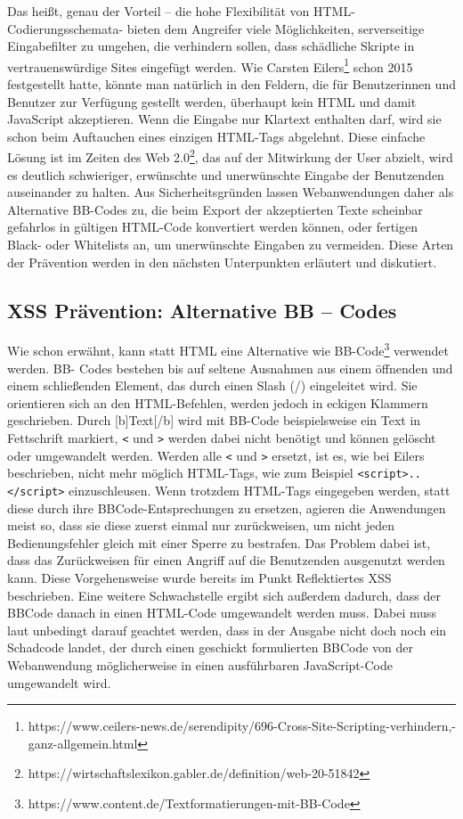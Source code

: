 Das heißt, genau der Vorteil – die hohe Flexibilität von HTML-Codierungsschemata- bieten dem Angreifer viele Möglichkeiten, serverseitige Eingabefilter zu umgehen, die verhindern sollen, dass schädliche Skripte in vertrauenswürdige Sites eingefügt werden.
Wie Carsten Eilers\footnote{https://www.ceilers-news.de/serendipity/696-Cross-Site-Scripting-verhindern,-ganz-allgemein.html} schon 2015 festgestellt hatte, könnte man natürlich in den Feldern, die für Benutzerinnen und Benutzer zur Verfügung gestellt werden, überhaupt kein HTML und damit JavaScript akzeptieren. Wenn die Eingabe nur Klartext enthalten darf, wird sie schon beim Auftauchen eines einzigen HTML-Tags abgelehnt. Diese einfache Lösung ist im Zeiten des Web 2.0\footnote{https://wirtschaftslexikon.gabler.de/definition/web-20-51842}, das auf der Mitwirkung der User abzielt, wird es deutlich schwieriger, erwünschte und unerwünschte Eingabe der Benutzenden auseinander zu halten. Aus Sicherheitsgründen lassen Webanwendungen daher als Alternative BB-Codes zu, die beim Export der akzeptierten Texte scheinbar gefahrlos in gültigen HTML-Code konvertiert werden können, oder fertigen Black- oder Whitelists an, um unerwünschte Eingaben zu vermeiden. Diese Arten der Prävention werden in den nächsten Unterpunkten erläutert und diskutiert.

\subsection{XSS Prävention: Alternative BB – Codes}
\label{subsection:prevention_bb-codes}

Wie schon erwähnt, kann statt HTML eine Alternative wie BB-Code\footnote{https://www.content.de/Textformatierungen-mit-BB-Code} verwendet werden. BB- Codes bestehen bis auf seltene Ausnahmen aus einem öffnenden und einem schließenden Element, das durch einen Slash (/) eingeleitet wird. Sie orientieren sich an den HTML-Befehlen, werden jedoch in eckigen Klammern geschrieben. Durch [b]Text[/b] wird mit BB-Code beispielsweise ein Text in Fettschrift markiert, \verb+<+ und \verb+>+ werden dabei nicht benötigt und können gelöscht oder umgewandelt werden.
Werden alle \verb+<+ und \verb+>+ ersetzt, ist es, wie bei Eilers beschrieben, nicht mehr möglich HTML-Tags, wie zum Beispiel \verb+<script>..</script>+  einzuschleusen. Wenn trotzdem HTML-Tags eingegeben werden, statt diese durch ihre BBCode-Entsprechungen zu ersetzen, agieren die Anwendungen meist so, dass sie diese zuerst einmal nur zurückweisen, um nicht jeden Bedienungsfehler gleich mit einer Sperre zu bestrafen. Das Problem dabei ist, dass das Zurückweisen für einen Angriff auf die Benutzenden ausgenutzt werden kann. Diese Vorgehensweise wurde bereits im Punkt Reflektiertes XSS beschrieben. Eine weitere Schwachstelle ergibt sich außerdem dadurch, dass der BBCode danach in einen HTML-Code umgewandelt werden muss. Dabei muss laut \textcite{eilers2015} unbedingt darauf geachtet werden, dass in der Ausgabe nicht doch noch ein Schadcode landet, der durch einen geschickt formulierten BBCode von der Webanwendung möglicherweise in einen ausführbaren JavaScript-Code umgewandelt wird.

